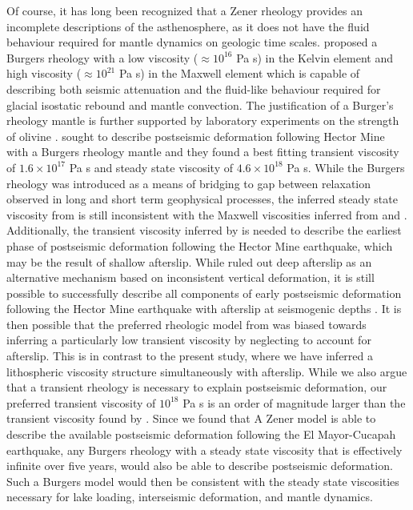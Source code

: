 \documentclass[1p]{elsarticle}
\begin{document}
Of course, it has long been recognized that a Zener rheology provides an incomplete descriptions of the asthenosphere, as it does not have the fluid behaviour required for mantle dynamics on geologic time scales. \citet{Yuen1982} proposed a Burgers rheology with a low viscosity ($\approx 10^{16}$ Pa s) in the Kelvin element and high viscosity ($\approx 10^{21}$ Pa s) in the Maxwell element which is capable of describing both seismic attenuation and the fluid-like behaviour required for glacial isostatic rebound and mantle convection. The justification of a Burger's rheology mantle is further supported by laboratory experiments on the strength of olivine \citep{Chopra1997}. \citet{Pollitz2003} sought to describe postseismic deformation following Hector Mine with a Burgers rheology mantle and they found a best fitting transient viscosity of $1.6\times10^{17}$ Pa s and steady state viscosity of $4.6\times10^{18}$ Pa s. While the Burgers rheology was introduced as a means of bridging to gap between relaxation observed in long and short term geophysical processes, the inferred steady state viscosity from \citet{Pollitz2003} is still inconsistent with the Maxwell viscosities inferred from \citet{Lundgren2009} and \citet{Luttrell2007}. Additionally, the transient viscosity inferred by \citet{Pollitz2003} is needed to describe the earliest phase of postseismic deformation following the Hector Mine earthquake, which may be the result of shallow afterslip. While \citet{Pollitz2003} ruled out deep afterslip as an alternative mechanism based on inconsistent vertical deformation, it is still possible to successfully describe all components of early postseismic deformation following the Hector Mine earthquake with afterslip at seismogenic depths \citep{Jacobs2002}. It is then possible that the preferred rheologic model from \citet{Pollitz2003} was biased towards inferring a particularly low transient viscosity by neglecting to account for afterslip.  This is in contrast to the present study, where we have inferred a lithospheric viscosity structure simultaneously with afterslip. While we also argue that a transient rheology is necessary to explain postseismic deformation, our preferred transient viscosity of $10^{18}$ Pa s is an order of magnitude larger than the transient viscosity found by \cite{Pollitz2003}.  Since we found that A Zener model is able to describe the available postseismic deformation following the El Mayor-Cucapah earthquake, any Burgers rheology with a steady state viscosity that is effectively infinite over five years, would also be able to describe postseismic deformation. Such a Burgers model would then be consistent with the steady state viscosities necessary for lake loading, interseismic deformation, and mantle dynamics.
\end{document}
